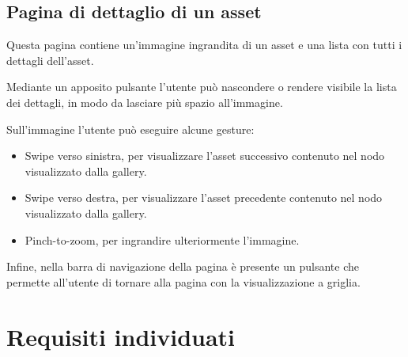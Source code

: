 \subsection{Pagina di dettaglio di un asset}\label{sec:pag-dettaglio-asset}

Questa pagina contiene un'immagine ingrandita di un asset e una lista con tutti i dettagli dell'asset.

Mediante un apposito pulsante l'utente può nascondere o rendere visibile la lista dei dettagli, in modo da lasciare più spazio all'immagine.

Sull'immagine l'utente può eseguire alcune gesture:
\begin{itemize}
\item Swipe verso sinistra, per visualizzare l'asset successivo contenuto nel nodo visualizzato dalla gallery.
\item Swipe verso destra, per visualizzare l'asset precedente contenuto nel nodo visualizzato dalla gallery.
\item Pinch-to-zoom, per ingrandire ulteriormente l'immagine.
\end{itemize}

Infine, nella barra di navigazione della pagina è presente un pulsante che permette all'utente di tornare alla pagina con la visualizzazione a griglia.


\section{Requisiti individuati}

